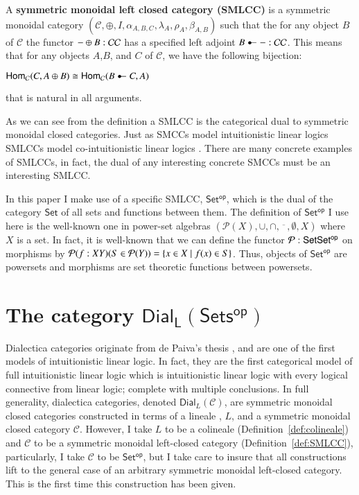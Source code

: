 \documentclass{llncs}
\let\to\relax
\newcommand{\to}{\rightarrow}
\newcommand{\powerset}[1]{\mathcal{P}(#1)}
\newcommand{\cat}[1]{\mathcal{#1}}
\newcommand{\Hom}[3]{\mathsf{Hom}_{\cat{#1}}(#2,#3)}
\newcommand{\dial}[1]{\mathsf{Dial_{#1}}(\mathsf{Sets^{op}})}
\begin{document}
\begin{definition}
  \label{def:SMLCC}
  A \textbf{symmetric monoidal left closed category (SMLCC)} is a symmetric monoidal category 
  $(\cat{C}, \oplus, I, \alpha_{A,B,C}, \lambda_{A}, \rho_{A}, \beta_{A,B})$
  such that
  the for any object $B$ of $\cat{C}$ the functor $- \oplus B : \cat{C} \to \cat{C}$ has a specified 
  left adjoint $B \multimapdotinv - : \cat{C} \to \cat{C}$.  This means that for any objects
  $A$,$B$, and $C$ of $\cat{C}$, we have the following bijection:
  \begin{center}
    \begin{math}
      \Hom{C}{C}{A \oplus B} \cong \Hom{C}{B \multimapdotinv C}{A}
    \end{math}
  \end{center}
  that is natural in all arguments.  
\end{definition}

As we can see from the definition a SMLCC is the categorical dual to
symmetric monoidal closed categories.  Just as SMCCs model
intuitionistic linear logics \cite{?} SMLCCs model co-intuitionistic
linear logics \cite{Bellin:2015}.  There are many concrete examples of
SMLCCs, in fact, the dual of any interesting concrete SMCCs must be an
interesting SMLCC.

In this paper I make use of a specific SMLCC, $\mathsf{Set^{op}}$,
which is the dual of the category $\mathsf{Set}$ of all sets and
functions between them.  The definition of $\mathsf{Set^{op}}$ I use
here is the well-known one in power-set algebras
$(\powerset{X},\cup,\cap,\overline{\stackrel{\,\,\,\,}{\stackrel{\,\,\,\,}{\,\,\,\,}}},\emptyset,X)$
where $X$ is a set.  In fact, it is well-known that we can define the functor $\mathcal{P} : \mathsf{Set} \to \mathsf{Set^{op}}$
on morphisms by $\mathcal{P}(f : X \to Y)(S \in \powerset{Y}) = \{ x \in X \mid f(x) \in S \}$.   Thus,
objects of $\mathsf{Set^{op}}$ are powersets and morphisms are set theoretic functions between powersets.

\section{The category $\dial{L}$}
\label{sec:the_category_dialL}
Dialectica categories originate from de Paiva's thesis
\cite{dePaiva:1987}, and are one of the first models of intuitionistic
linear logic.  In fact, they are the first categorical model of full
intuitionistic linear logic which is intuitionistic linear logic with
every logical connective from linear logic; complete with multiple
conclusions.  In full generality, dialectica categories, denoted
$\mathsf{Dial}_{L}(\cat{C})$, are symmetric monoidal closed categories
constructed in terms of a lineale \cite{?}, $L$, and a symmetric
monoidal closed category $\cat{C}$.  However, I take $L$ to be a
colineale (Definition~\ref{def:colineale}) and $\cat{C}$ to be a
symmetric monoidal left-closed category (Definition~\ref{def:SMLCC}),
particularly, I take $\cat{C}$ to be $\mathsf{Set^{op}}$, but I take
care to insure that all constructions lift to the general case of an
arbitrary symmetric monoidal left-closed category.  This is the first
time this construction has been given.
\end{document}
